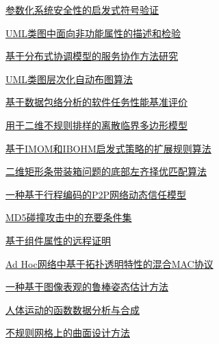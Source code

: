 \documentclass[a4paper]{article}
\begin{document}
\href{http://www.jos.org.cn/ch/reader/download_pdf.aspx?file_no=3352&year_id=2009&quarter_id=6&falg=1}{参数化系统安全性的启发式符号验证}

\href{http://www.jos.org.cn/ch/reader/download_pdf.aspx?file_no=3455&year_id=2009&quarter_id=6&falg=1}{UML类图中面向非功能属性的描述和检验}

\href{http://www.jos.org.cn/ch/reader/download_pdf.aspx?file_no=3353&year_id=2009&quarter_id=6&falg=1}{基于分布式协调模型的服务协作方法研究}

\href{http://www.jos.org.cn/ch/reader/download_pdf.aspx?file_no=3417&year_id=2009&quarter_id=6&falg=1}{UML类图层次化自动布图算法}

\href{http://www.jos.org.cn/ch/reader/download_pdf.aspx?file_no=564&year_id=2009&quarter_id=6&falg=1}{基于数据包络分析的软件任务性能基准评价}

\href{http://www.jos.org.cn/ch/reader/download_pdf.aspx?file_no=3331&year_id=2009&quarter_id=6&falg=1}{用于二维不规则排样的离散临界多边形模型}

\href{http://www.jos.org.cn/ch/reader/download_pdf.aspx?file_no=3420&year_id=2009&quarter_id=6&falg=1}{基于IMOM和IBOHM启发式策略的扩展规则算法}

\href{http://www.jos.org.cn/ch/reader/download_pdf.aspx?file_no=3395&year_id=2009&quarter_id=6&falg=1}{二维矩形条带装箱问题的底部左齐择优匹配算法}

\href{http://www.jos.org.cn/ch/reader/download_pdf.aspx?file_no=3408&year_id=2009&quarter_id=6&falg=1}{一种基于行程编码的P2P网络动态信任模型}

\href{http://www.jos.org.cn/ch/reader/download_pdf.aspx?file_no=3349&year_id=2009&quarter_id=6&falg=1}{MD5碰撞攻击中的充要条件集}

\href{http://www.jos.org.cn/ch/reader/download_pdf.aspx?file_no=3343&year_id=2009&quarter_id=6&falg=1}{基于组件属性的远程证明}

\href{http://www.jos.org.cn/ch/reader/download_pdf.aspx?file_no=567&year_id=2009&quarter_id=6&falg=1}{Ad Hoc网络中基于拓扑透明特性的混合MAC协议}

\href{http://www.jos.org.cn/ch/reader/download_pdf.aspx?file_no=3372&year_id=2009&quarter_id=6&falg=1}{一种基于图像表观的鲁棒姿态估计方法}

\href{http://www.jos.org.cn/ch/reader/download_pdf.aspx?file_no=3332&year_id=2009&quarter_id=6&falg=1}{人体运动的函数数据分析与合成}

\href{http://www.jos.org.cn/ch/reader/download_pdf.aspx?file_no=3393&year_id=2009&quarter_id=6&falg=1}{不规则网格上的曲面设计方法}
\end{document}
